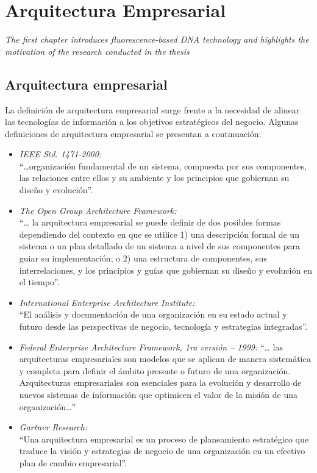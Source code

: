 \chapter{Arquitectura Empresarial}
\label{chap:aEmpresarial}
\textit{The first chapter introduces fluorescence-based DNA technology and highlights the motivation of the research conducted in the thesis}
\vfill
\minitoc
\newpage

\section{Arquitectura empresarial}
La definición de arquitectura empresarial surge frente a la necesidad de alinear las tecnologías de información a los objetivos estratégicos del negocio. Algunas definiciones de arquitectura empresarial se presentan a continuación:
  
  \begin{itemize}
	\item \textit{IEEE Std. 1471-2000:} \\
	“…organización fundamental de un sistema, compuesta por sus componentes, las relaciones entre ellos y su ambiente y los principios que gobiernan su diseño y evolución”.
	\item \textit{The Open Group Architecture Framework:} \\
	“… la arquitectura empresarial se puede definir de dos posibles formas dependiendo del contexto en que se utilice 1) una descripción formal de un sistema o un plan detallado de un sistema a nivel de sus componentes para guiar su implementación; o 2) una estructura de componentes, sus interrelaciones, y los principios y guías que gobiernan su diseño y evolución en el tiempo”.
	\item \textit{International Enterprise Architecture Institute:} \\
	“El análisis y documentación de una organización en su estado actual y futuro desde las perspectivas de negocio, tecnología y estrategias integradas”.
	\item \textit{Federal Enterprise Architecture Framework, 1ra versión – 1999:}
	“… las arquitecturas empresariales son modelos que se aplican de manera sistemática y completa para definir el ámbito presente o futuro de una organización. Arquitecturas empresariales son esenciales para la evolución y desarrollo de nuevos sistemas de información que optimicen el valor de la misión de una organización…”
	\item \textit{Gartner Research:} \\
	“Una arquitectura empresarial es un proceso de planeamiento estratégico que traduce la visión y estrategias de negocio de una organización en un efectivo plan de cambio empresarial”.
  \end{itemize}

